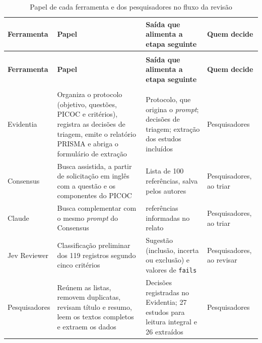 \begingroup
\setlength{\tabcolsep}{3pt}
\begin{longtable}{|>{\footnotesize\raggedright\arraybackslash}p{2.5cm}|>{\footnotesize\raggedright\arraybackslash}p{4.9cm}|>{\footnotesize\raggedright\arraybackslash}p{4.4cm}|>{\footnotesize\raggedright\arraybackslash}p{3.2cm}|}
	\caption{Papel de cada ferramenta e dos pesquisadores no fluxo da revisão}\label{tab:papel-ferramentas} \\
	\hline
	\textbf{Ferramenta} & \textbf{Papel}                                                                                                                                            & \textbf{Saída que alimenta a etapa seguinte}                                                  & \textbf{Quem decide}      \\ \hline
	\endfirsthead
	\multicolumn{4}{l}{\footnotesize\textit{Tabela~\ref{tab:papel-ferramentas} (continuação)}} \\
	\hline
	\textbf{Ferramenta} & \textbf{Papel}                                                                                                                                            & \textbf{Saída que alimenta a etapa seguinte}                                                  & \textbf{Quem decide}      \\ \hline
	\endhead
	\multicolumn{4}{r}{\footnotesize\textit{continua na próxima página}} \\
	\endfoot
	\endlastfoot
	Evidentia           & Organiza o protocolo (objetivo, questões, PICOC e critérios), registra as decisões de triagem, emite o relatório PRISMA e abriga o formulário de extração & Protocolo, que origina o \textit{prompt}; decisões de triagem; extração dos estudos incluídos & Pesquisadores             \\ \hline
		Consensus           & Busca assistida, a partir de solicitação em inglês com a questão e os componentes do PICOC                                                                & Lista de 100 referências, salva pelos autores                                                 & Pesquisadores, ao triar   \\ \hline
		Claude              & Busca complementar com o mesmo \textit{prompt} do Consensus                                                                                               & 30 referências informadas no relato                                                           & Pesquisadores, ao triar   \\ \hline
		Jev Reviewer        & Classificação preliminar dos 119 registros segundo cinco critérios                                                                                        & Sugestão (inclusão, incerta ou exclusão) e valores de \texttt{fails}                          & Pesquisadores, ao revisar \\ \hline
		Pesquisadores       & Reúnem as listas, removem duplicatas, revisam título e resumo, leem os textos completos e extraem os dados                                                & Decisões registradas no Evidentia; 27 estudos para leitura integral e 26 extraídos            & Pesquisadores             \\ \hline
\end{longtable}
\endgroup
{}

